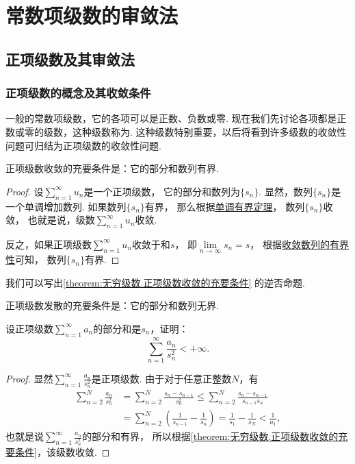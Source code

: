 \section{常数项级数的审敛法}
\subsection{正项级数及其审敛法}
\subsubsection{正项级数的概念及其收敛条件}
一般的常数项级数，它的各项可以是正数、负数或零.
现在我们先讨论各项都是正数或零的级数，这种级数称为.
这种级数特别重要，以后将看到许多级数的收敛性问题可归结为正项级数的收敛性问题.

\begin{theorem}\label{theorem:无穷级数.正项级数收敛的充要条件}
正项级数收敛的充要条件是：它的部分和数列有界.
\begin{proof}
设\(\sum\limits_{n=1}^\infty u_n\)是一个正项级数，
它的部分和数列为\(\{s_n\}\).
显然，数列\(\{s_n\}\)是一个单调增加数列.
如果数列\(\{s_n\}\)有界，
那么根据\hyperref[theorem:极限.数列的单调有界定理]{单调有界定理}，
数列\(\{s_n\}\)收敛，
也就是说，级数\(\sum\limits_{n=1}^\infty u_n\)收敛.

反之，如果正项级数\(\sum\limits_{n=1}^\infty u_n\)收敛于和\(s\)，
即\(\lim\limits_{n\to\infty} s_n = s\)，
根据\hyperref[theorem:极限.收敛数列的有界性]{收敛数列的有界性}可知，
数列\(\{s_n\}\)有界.
\end{proof}
\end{theorem}

我们可以写出\cref{theorem:无穷级数.正项级数收敛的充要条件} 的逆否命题.
\begin{proposition}
正项级数发散的充要条件是：它的部分和数列无界.
\end{proposition}

\begin{example}
设正项级数\(\sum\limits_{n=1}^\infty a_n\)的部分和是\(s_n\)，证明：\[
	\sum\limits_{n=1}^\infty \frac{a_n}{s_n^2} < +\infty.
\]
\begin{proof}
显然\(\sum\limits_{n=1}^\infty \frac{a_n}{s_n^2}\)是正项级数.
由于对于任意正整数\(N\)，有\begin{align*}
	\sum_{n=2}^N \frac{a_n}{s_n^2}
	&= \sum_{n=2}^N \frac{s_n-s_{n-1}}{s_n^2}
	\leq \sum_{n=2}^N \frac{s_n-s_{n-1}}{s_{n-1} s_n} \\
	&= \sum_{n=2}^N \left(
			\frac{1}{s_{n-1}} - \frac{1}{s_n}
		\right)
	= \frac{1}{s_1} - \frac{1}{s_N}
	< \frac{1}{a_1},
\end{align*}
也就是说\(\sum\limits_{n=1}^\infty \frac{a_n}{s_n^2}\)的部分和有界，
所以根据\cref{theorem:无穷级数.正项级数收敛的充要条件}，该级数收敛.
\end{proof}
\end{example}


